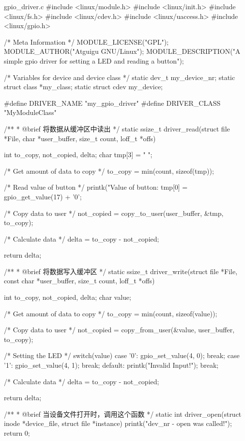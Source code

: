 \documentclass[lang=cn,newtx,10pt,scheme=chinese]{elegantbook}
\begin{document}
\begin{mycode}{gpio\_driver.c}
#include <linux/module.h>
#include <linux/init.h>
#include <linux/fs.h>
#include <linux/cdev.h>
#include <linux/uaccess.h>
#include <linux/gpio.h>

/* Meta Information */
MODULE_LICENSE("GPL");
MODULE_AUTHOR("Atguigu GNU/Linux");
MODULE_DESCRIPTION("A simple gpio driver for setting a LED and reading a button");

/* Variables for device and device class */
static dev_t my_device_nr;
static struct class *my_class;
static struct cdev my_device;

#define DRIVER_NAME "my_gpio_driver"
#define DRIVER_CLASS "MyModuleClass"

/**
 * @brief 将数据从缓冲区中读出
 */
static ssize_t driver_read(struct file *File, char *user_buffer, size_t count, loff_t *offs) {
    int to_copy, not_copied, delta;
    char tmp[3] = " \n";

    /* Get amount of data to copy */
    to_copy = min(count, sizeof(tmp));

    /* Read value of button */
    printk("Value of button: %
    tmp[0] = gpio_get_value(17) + '0';

    /* Copy data to user */
    not_copied = copy_to_user(user_buffer, &tmp, to_copy);

    /* Calculate data */
    delta = to_copy - not_copied;

    return delta;
}

/**
 * @brief 将数据写入缓冲区
 */
static ssize_t driver_write(struct file *File, const char *user_buffer, size_t count, loff_t *offs) {
    int to_copy, not_copied, delta;
    char value;

    /* Get amount of data to copy */
    to_copy = min(count, sizeof(value));

    /* Copy data to user */
    not_copied = copy_from_user(&value, user_buffer, to_copy);

    /* Setting the LED */
    switch(value) {
        case '0':
            gpio_set_value(4, 0);
            break;
        case '1':
            gpio_set_value(4, 1);
            break;
        default:
            printk("Invalid Input!\n");
            break;
    }

    /* Calculate data */
    delta = to_copy - not_copied;

    return delta;
}

/**
 * @brief 当设备文件打开时，调用这个函数
 */
static int driver_open(struct inode *device_file, struct file *instance) {
    printk("dev_nr - open was called!\n");
    return 0;
}


\end{mycode}
\end{document}
